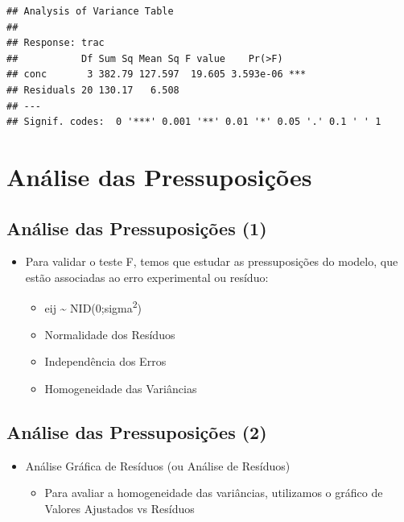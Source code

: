 \documentclass[
]{book}
\providecommand{\tightlist}{%
  \setlength{\itemsep}{0pt}\setlength{\parskip}{0pt}}
\begin{document}
\begin{verbatim}
## Analysis of Variance Table
## 
## Response: trac
##           Df Sum Sq Mean Sq F value    Pr(>F)    
## conc       3 382.79 127.597  19.605 3.593e-06 ***
## Residuals 20 130.17   6.508                      
## ---
## Signif. codes:  0 '***' 0.001 '**' 0.01 '*' 0.05 '.' 0.1 ' ' 1
\end{verbatim}

\section{Análise das Pressuposições}\label{anuxe1lise-das-pressuposiuxe7uxf5es}

\subsection{Análise das Pressuposições (1)}\label{anuxe1lise-das-pressuposiuxe7uxf5es-1}

\begin{itemize}
\tightlist
\item
  Para validar o teste F, temos que estudar as pressuposições do modelo, que estão associadas ao erro experimental ou resíduo:

  \begin{itemize}
  \tightlist
  \item
    eij \textasciitilde{} NID(0;sigma\textsuperscript{2})
  \item
    Normalidade dos Resíduos
  \item
    Independência dos Erros
  \item
    Homogeneidade das Variâncias
  \end{itemize}
\end{itemize}

\subsection{Análise das Pressuposições (2)}\label{anuxe1lise-das-pressuposiuxe7uxf5es-2}

\begin{itemize}
\item
  Análise Gráfica de Resíduos (ou Análise de Resíduos)

  \begin{itemize}
  \tightlist
  \item
    Para avaliar a homogeneidade das variâncias, utilizamos o gráfico de Valores Ajustados vs Resíduos
  \end{itemize}
\end{itemize}
\end{document}
